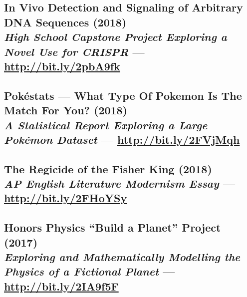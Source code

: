 \documentclass[twocolumn, a4paper, fontsize=9pt, headsepline, footsepline]{scrartcl}
\begin{document}

\subsection*{In Vivo Detection and Signaling of Arbitrary DNA Sequences
  (2018)\\\hspace{14.22636pt}\textmd{\emph{High School Capstone Project Exploring
    a Novel Use for CRISPR} — \url{http://bit.ly/2pbA9fk}}}

\subsection*{Pokéstats — What Type Of Pokemon Is The Match For You?
  (2018)\\\hspace{14.22636pt}\textmd{\emph{A Statistical Report Exploring a
    Large Pokémon Dataset} — \url{http://bit.ly/2FVjMqh}}}

\subsection*{The Regicide of the Fisher King (2018)\\\hspace{14.22636pt}\textmd{\emph{AP English
    Literature Modernism Essay} — \url{http://bit.ly/2FHoYSy}}}

\subsection*{Honors Physics “Build a Planet” Project (2017)\\\hspace{14.22636pt}\textmd{\emph{Exploring and
    Mathematically Modelling the Physics of a Fictional Planet} —
    \url{http://bit.ly/2IA9f5F}}}

\end{document}
